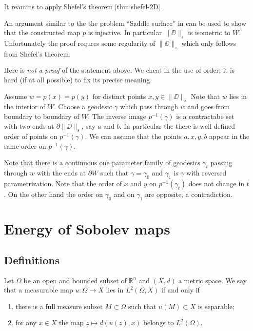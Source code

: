 \documentclass[a4paper,10pt]{amsart}
\begin{document}
It reamins to apply Shefel's theorem \ref{thm:shefel-2D}.
\qeds



 An argument similar to the the problem ``Saddle surface'' in \cite{petrunin-orthodox}
can be used to show that the constructed map $p$ 
is injective. 
In particular $\|\DD\|_s$ is isometric to $W$.
Unfortunately the proof requres some regularity of $\|\DD\|_s$ which only follows from Shefel's theorem. 

Here is \emph{not a proof} of the statement above.
We cheat in the use of order; 
it is hard (if at all possible) to fix its precise meaning.

 Assume  $w=p(x)=p(y)$ for distinct points $x,y\in\|\DD\|_s$
Note that  $w$ lies in the interior of $W$.
Choose a geodesic $\gamma$ which pass through $w$ and goes 
from boundary to boundary of $W$.
The inverse image $p^{-1}(\gamma)$ is a contractabe set with two ends at $\partial\|\DD\|_s$, say $a$ and $b$.
In particular the there is well defined order of  points on $p^{-1}(\gamma)$.
We can assume that the points $a,x,y,b$ appear in the same order on $p^{-1}(\gamma)$. 

Note that there is a continuous one parameter family of geodesics $\gamma_t$ passing through $w$ with the ends at $\partial W$
such that $\gamma=\gamma_0$ and $\gamma_1$ is $\gamma$ with reversed parametrization.
Note that the order of $x$ and $y$ on $p^{-1}(\gamma_t)$ does not change in $t$.
On the other hand the order on $\gamma_0$ and on $\gamma_1$ are opposite, a contradiction.\qeds 

\section{Energy of Sobolev maps}

\subsection{Definitions}

Let $\Omega$ be an open and bounded subset of $\mathbb{R}^n$ and $(X,d)$ a metric space.
We say that a measurable map $u:\Omega\to X$ lies in 
$L^2(\Omega,X)$ if and only if
\begin{enumerate}
 \item there is a full measure subset $M\subset \Omega$ such that $u(M)\subset X$ is separable;
 \item for any $x\in X$ the map $z\mapsto d(u(z),x)$ belongs to $L^2(\Omega)$.
\end{enumerate}
\end{document}
